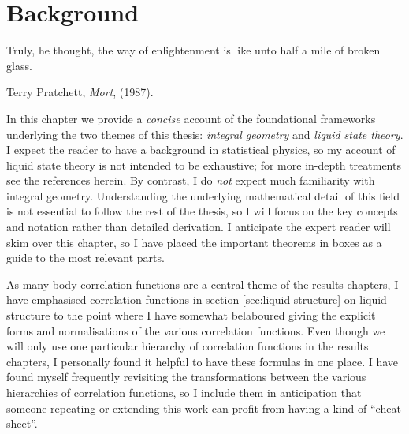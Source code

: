 \documentclass[11pt,twoside]{report}
\def\includebibliography{}
\begin{document}
\chapter{Background}
\epigraph{Truly, he thought, the way of enlightenment is like unto half a mile of broken glass.}{Terry Pratchett, \emph{Mort}, (1987).}
\label{chapter:background}

In this chapter we provide a \emph{concise} account of the foundational frameworks underlying the two themes of this thesis: \emph{integral geometry} and \emph{liquid state theory}.
I expect the reader to have a background in statistical physics, so my account of liquid state theory is not intended to be exhaustive; for more in-depth treatments see the references herein.
By contrast, I do \emph{not} expect much familiarity with integral geometry.
Understanding the underlying mathematical detail of this field is not essential to follow the rest of the thesis, so I will focus on the key concepts and notation rather than detailed derivation.
I anticipate the expert reader will skim over this chapter, so I have placed the important theorems in boxes as a guide to the most relevant parts.

As many-body correlation functions are a central theme of the results chapters, I have emphasised correlation functions in section \ref{sec:liquid-structure} on liquid structure to the point where I have somewhat belaboured giving the explicit forms and normalisations of the various correlation functions.
Even though we will only use one particular hierarchy of correlation functions in the results chapters, I personally found it helpful to have these formulas in one place.
I have found myself frequently revisiting the transformations between the various hierarchies of correlation functions, so I include them in anticipation that someone repeating or extending this work can profit from having a kind of ``cheat sheet''.






\ifdefined\includebibliography
  \printbibliography
\fi
\end{document}
